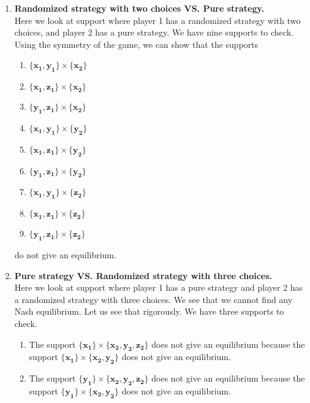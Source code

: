 \begin{enumerate} [label=\Alph*. ]
\item \textbf{Randomized strategy with two choices VS. Pure strategy.} \\
Here we look at support where player 1 has a randomized strategy with two choices, and player 2 has a pure strategy. We have nine supports to check. Using the symmetry of the game, we can show that the supports
\begin{enumerate} [label*= (\arabic*)]
    \item $\mathbf{\{x_1, y_1\}} \times \mathbf{\{x_2\}}$
    \item $\mathbf{\{x_1, z_1\}} \times \mathbf{\{x_2\}}$
    \item $\mathbf{\{y_1, z_1\}} \times \mathbf{\{x_2\}}$
    
    \item $\mathbf{\{x_1, y_1\}} \times \mathbf{\{y_2\}}$
    \item $\mathbf{\{x_1, z_1\}} \times \mathbf{\{y_2\}}$
    \item $\mathbf{\{y_1, z_1\}} \times \mathbf{\{y_2\}}$
    
    \item $\mathbf{\{x_1, y_1\}} \times \mathbf{\{z_2\}}$
    \item $\mathbf{\{x_1, z_1\}} \times \mathbf{\{z_2\}}$
    \item $\mathbf{\{y_1, z_1\}} \times \mathbf{\{z_2\}}$
\end{enumerate}

do not give an equilibrium.


\item \textbf{Pure strategy VS. Randomized strategy with three choices.} \\
Here we look at support where player 1 has a pure strategy and player 2 has a randomized strategy with three choices. We see that we cannot find any Nash equilibrium. Let us see that rigorously. We have three supports to check.

\begin{enumerate} [label*= (\arabic*)]
    \item The support $\mathbf{\{x_1\}} \times \mathbf{\{x_2, y_2, z_2\}}$ does not give an equilibrium because the support $\mathbf{\{x_1\}} \times \mathbf{\{x_2, y_2\}}$ does not give an equilibrium.
    
    \item The support $\mathbf{\{y_1\}} \times \mathbf{\{x_2, y_2, z_2\}}$ does not give an equilibrium because the support $\mathbf{\{y_1\}} \times \mathbf{\{x_2, y_2\}}$ does not give an equilibrium.
    

\end{enumerate}
\end{enumerate}
